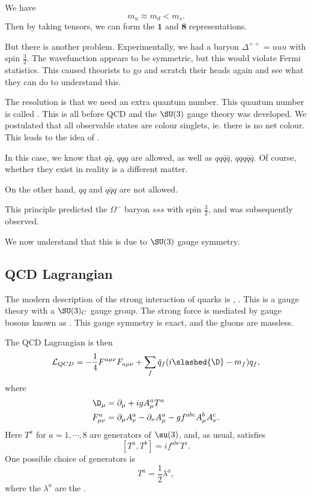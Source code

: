 \documentclass[a4paper]{article}
\begin{document}
We have
\[
  m_u \approx m_d < m_s.
\]
Then by taking tensors, we can form the $\mathbf{1}$ and $\mathbf{8}$ representations.

But there is another problem. Experimentally, we had a baryon $\Delta^{++} = uuu$ with spin $\frac{3}{2}$. The wavefunction appears to be symmetric, but this would violate Fermi statistics. This caused theorists to go and scratch their heads again and see what they can do to understand this.

The resolution is that we need an extra quantum number. This quantum number is called . This is all before QCD and the $\SU(3)$ gauge theory was developed. We postulated that all observable states are colour singlets, ie. there is no net colour. This leads to the idea of .

In this case, we know that $q\bar{q}$, $qqq$ are allowed, as well as $qq\bar{q}\bar{q}$, $qqq\bar{q}\bar{q}$. Of course, whether they exist in reality is a different matter.

On the other hand, $qq$ and $q \bar{q} q$ are not allowed.

This principle predicted the $\Omega^-$ baryon $sss$ with spin $\frac{3}{2}$, and was subsequently observed.

We now understand that this is due to $\SU(3)$ gauge symmetry.

\subsection{QCD Lagrangian}
The modern description of the strong interaction of quarks is , . This is a gauge theory with a $\SU(3)_C$ gauge group. The strong force is mediated by gauge bosons known as . This gauge symmetry is exact, and the gluons are massless.

The QCD Lagrangian is then
\[
  \mathcal{L}_{QCD} = -\frac{1}{4} F^{a\mu\nu} F_{a\mu\nu} + \sum_f \bar{q}_f (i \slashed{\D} - m_f) q_f,
\]
where
\begin{align*}
  \D_\mu &= \partial_\mu + i g A_\mu^a T^a\\
  F_{\mu\nu}^a &= \partial_\mu A_\nu^a - \partial_\nu A_\mu^a - g f^{abc} A_\mu^b A_\nu^c.
\end{align*}
Here $T^a$ for $a = 1, \cdots, 8$ are generators of $\su(3)$, and, as usual, satisfies
\[
  [T^a, T^b] = i f^{abc}T^c.
\]
One possible choice of generators is
\[
  T^a = \frac{1}{2} \lambda^a,
\]
where the $\lambda^a$ are the .
\end{document}
